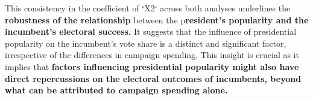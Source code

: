 \documentclass[12pt]{article}
\begin{document}
This consistency in the coefficient of `X2` across both analyses underlines the \textbf{robustness of the relationship }between the p\textbf{resident’s popularity and the incumbent’s electoral success.} It suggests that the influence of presidential popularity on the incumbent's vote share is a distinct and significant factor, irrespective of the differences in campaign spending. This insight is crucial as it implies that \textbf{factors influencing presidential popularity might also have direct repercussions on the electoral outcomes of incumbents, beyond what can be attributed to campaign spending alone.}
\end{document}
